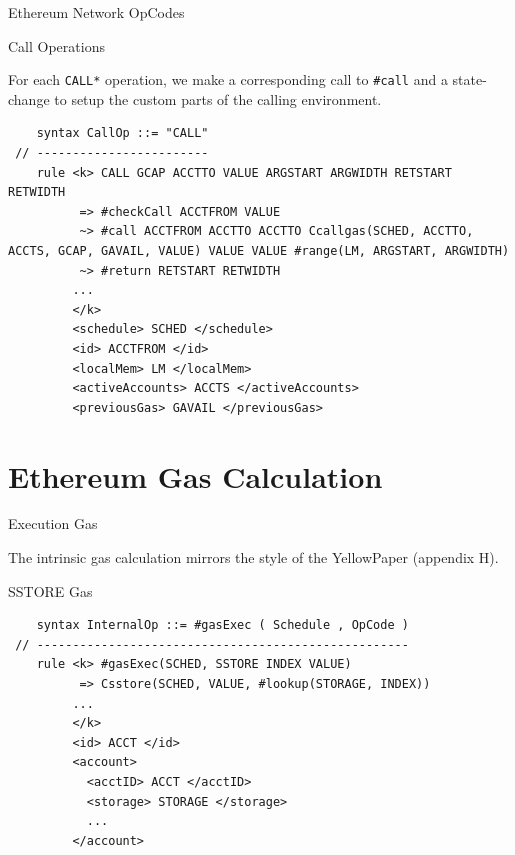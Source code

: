 \documentclass[8pt,ignorenonframetext,]{beamer}
\begin{document}
\begin{frame}[fragile]{Ethereum Network OpCodes}

\pause

\begin{block}{Call Operations}

For each \texttt{CALL*} operation, we make a corresponding call to
\texttt{\#call} and a state-change to setup the custom parts of the
calling environment.

\begin{verbatim}
    syntax CallOp ::= "CALL"
 // ------------------------
    rule <k> CALL GCAP ACCTTO VALUE ARGSTART ARGWIDTH RETSTART RETWIDTH
          => #checkCall ACCTFROM VALUE
          ~> #call ACCTFROM ACCTTO ACCTTO Ccallgas(SCHED, ACCTTO, ACCTS, GCAP, GAVAIL, VALUE) VALUE VALUE #range(LM, ARGSTART, ARGWIDTH)
          ~> #return RETSTART RETWIDTH
         ...
         </k>
         <schedule> SCHED </schedule>
         <id> ACCTFROM </id>
         <localMem> LM </localMem>
         <activeAccounts> ACCTS </activeAccounts>
         <previousGas> GAVAIL </previousGas>
\end{verbatim}

\end{block}

\end{frame}

\section{Ethereum Gas Calculation}\label{ethereum-gas-calculation}

\begin{frame}[fragile]{Execution Gas}

The intrinsic gas calculation mirrors the style of the YellowPaper
(appendix H).

\pause

\begin{block}{SSTORE Gas}

\begin{verbatim}
    syntax InternalOp ::= #gasExec ( Schedule , OpCode )
 // ----------------------------------------------------
    rule <k> #gasExec(SCHED, SSTORE INDEX VALUE)
          => Csstore(SCHED, VALUE, #lookup(STORAGE, INDEX))
         ...
         </k>
         <id> ACCT </id>
         <account>
           <acctID> ACCT </acctID>
           <storage> STORAGE </storage>
           ...
         </account>
\end{verbatim}

\end{block}

\end{frame}
\end{document}
